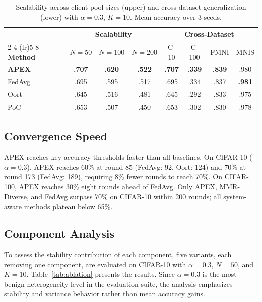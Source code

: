 \documentclass[journal]{IEEEtran}
\begin{document}
\begin{table}[t]
\centering
\caption{Scalability across client pool sizes (upper) and cross-dataset generalization (lower) with $\alpha = 0.3$, $K = 10$. Mean accuracy over 3 seeds.}
\label{tab:scale_cross}
\footnotesize
\renewcommand{\arraystretch}{1.0}
\setlength{\tabcolsep}{3pt}
\begin{tabular}{lccccccc}
\toprule
& \multicolumn{3}{c}{\textbf{Scalability}} & \multicolumn{4}{c}{\textbf{Cross-Dataset}} \\
\cmidrule(lr){2-4} \cmidrule(lr){5-8}
\textbf{Method} & $N\!=\!50$ & $N\!=\!100$ & $N\!=\!200$ & C-10 & C-100 & FMNI & MNIS \\
\midrule
\textbf{APEX} & \textbf{.707} & \textbf{.620} & \textbf{.522} & \textbf{.707} & \textbf{.339} & \textbf{.839} & .980 \\
FedAvg & .695 & .595 & .517 & .695 & .334 & .837 & \textbf{.981} \\
Oort & .645 & .516 & .481 & .645 & .292 & .833 & .975 \\
PoC & .653 & .507 & .450 & .653 & .302 & .830 & .978 \\
\bottomrule
\end{tabular}
\end{table}

\subsection{Convergence Speed}

APEX reaches key accuracy thresholds faster than all baselines. On CIFAR-10 ($\alpha = 0.3$), APEX reaches 60\% at round 85 (FedAvg: 92, Oort: 124) and 70\% at round 173 (FedAvg: 189), requiring 8\% fewer rounds to reach 70\%. On CIFAR-100, APEX reaches 30\% eight rounds ahead of FedAvg. Only APEX, MMR-Diverse, and FedAvg surpass 70\% on CIFAR-10 within 200 rounds; all system-aware methods plateau below 65\%.

\subsection{Component Analysis}

To assess the stability contribution of each component, five variants, each removing one component, are evaluated on CIFAR-10 with $\alpha = 0.3$, $N = 50$, and $K = 10$. Table~\ref{tab:ablation} presents the results. Since $\alpha = 0.3$ is the most benign heterogeneity level in the evaluation suite, the analysis emphasizes stability and variance behavior rather than mean accuracy gains.
\end{document}
